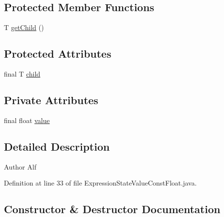 \subsection*{Protected Member Functions}
\begin{DoxyCompactItemize}
\item 
T \hyperlink{classgov_1_1nasa_1_1jpf_1_1inspector_1_1server_1_1expression_1_1_expression_state_unary_operator_a150bac338d6557f79ca185d3f6ad6e06}{get\+Child} ()
\end{DoxyCompactItemize}
\subsection*{Protected Attributes}
\begin{DoxyCompactItemize}
\item 
final T \hyperlink{classgov_1_1nasa_1_1jpf_1_1inspector_1_1server_1_1expression_1_1_expression_state_unary_operator_a66041b1f569a361549e28a00f7ca5f2f}{child}
\end{DoxyCompactItemize}
\subsection*{Private Attributes}
\begin{DoxyCompactItemize}
\item 
final float \hyperlink{classgov_1_1nasa_1_1jpf_1_1inspector_1_1server_1_1expression_1_1expressions_1_1_expression_state_value_const_float_a19b7c4061f54cd4ef3121ebb9d6c8e65}{value}
\end{DoxyCompactItemize}


\subsection{Detailed Description}
\begin{DoxyAuthor}{Author}
Alf 
\end{DoxyAuthor}


Definition at line 33 of file Expression\+State\+Value\+Const\+Float.\+java.



\subsection{Constructor \& Destructor Documentation}
